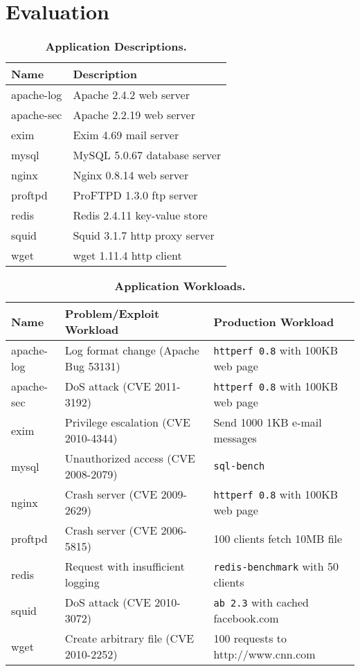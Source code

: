 \section{Evaluation}
\label{dora:sec:results}


\begin{table}
\centering
\begin{tabular}{ll}
  \toprule
{\bf Name}     & {\bf Description}             \\ \midrule
		apache-log & Apache 2.4.2 web server       \\
		apache-sec & Apache 2.2.19 web server      \\
		exim       & Exim 4.69 mail server         \\
		mysql      & MySQL 5.0.67 database server  \\
		nginx      & Nginx 0.8.14 web server       \\
		proftpd    & ProFTPD 1.3.0 ftp server      \\
		redis      & Redis 2.4.11 key-value store  \\
		squid      & Squid 3.1.7 http proxy server \\
		wget       & wget 1.11.4 http client       \\
  \bottomrule
\end{tabular}
\caption{{\bf Application Descriptions.}}
\label{dora:tab:applications}
\end{table}

\begin{table}
\centering
\begin{tabular}{lll}
  \toprule
{\bf Name}     & {\bf Problem/Exploit Workload}        & {\bf Production Workload}             \\ \midrule
		apache-log & Log format change (Apache Bug 53131)  & {\tt httperf 0.8} with 100KB web page \\
		apache-sec & DoS attack (CVE 2011-3192)            & {\tt httperf 0.8} with 100KB web page \\
		exim       & Privilege escalation (CVE 2010-4344)  & Send 1000 1KB e-mail messages         \\
		mysql      & Unauthorized access (CVE 2008-2079)   & {\tt sql-bench}                       \\
		nginx      & Crash server (CVE 2009-2629)          & {\tt httperf 0.8} with 100KB web page \\
		proftpd    & Crash server (CVE 2006-5815)          & 100 clients fetch 10MB file           \\
		redis      & Request with insufficient logging     & {\tt redis-benchmark} with 50 clients \\
		squid      & DoS attack (CVE 2010-3072)            & {\tt ab 2.3} with cached facebook.com \\
		wget       & Create arbitrary file (CVE 2010-2252) & 100 requests to http://www.cnn.com    \\
  \bottomrule
\end{tabular}
\caption{{\bf Application Workloads.}}
\label{dora:tab:workloads}
\end{table}

